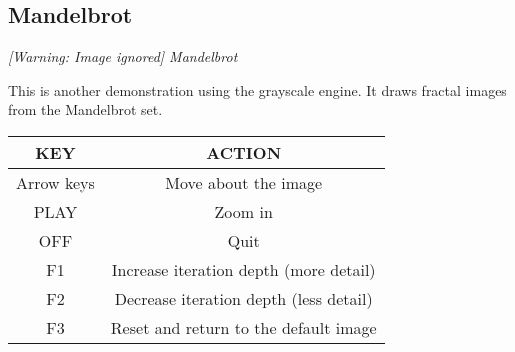 \subsection{Mandelbrot}
{\centering\itshape
  [Warning: Image ignored] %
 \newline
Mandelbrot
\par}

This is another demonstration using the grayscale engine.  It draws fractal images from the Mandelbrot set.

\begin{table}[h!]
\begin{center}
\begin{tabular}{|c|c|}
\hline
KEY & ACTION \\\hline
Arrow keys & Move about the image \\\hline
PLAY & Zoom in \\\hline
OFF & Quit \\\hline
F1 & Increase iteration depth (more detail) \\\hline
F2 & Decrease iteration depth (less detail) \\\hline
F3 & Reset and return to the default image \\\hline
\end{tabular}
\end{center}
\end{table}

